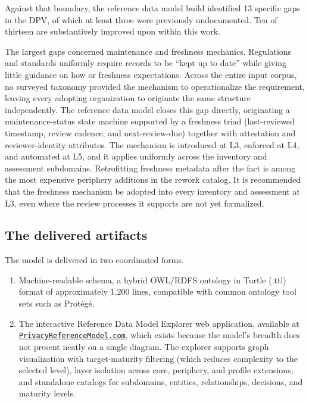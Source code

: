 \documentclass[10pt,letterpaper,twocolumn,twoside]{rho-class/rho}
\begin{document}
Against that boundary, the reference data model build identified 13 specific gaps in the DPV, of which at least three were previously undocumented. Ten of thirteen are substantively improved upon within this work.

The largest gaps concerned maintenance and freshness mechanics. Regulations and standards uniformly require records to be ``kept up to date'' while giving little guidance on how or freshness expectations. Across the entire input corpus, no surveyed taxonomy provided the mechanism to operationalize the requirement, leaving every adopting organization to originate the same structure independently. The reference data model closes this gap directly, originating a maintenance-status state machine supported by a freshness triad (last-reviewed timestamp, review cadence, and next-review-due) together with attestation and reviewer-identity attributes. The mechanism is introduced at L3, enforced at L4, and automated at L5, and it applies uniformly across the inventory and assessment subdomains. Retrofitting freshness metadata after the fact is among the most expensive periphery additions in the rework catalog. It is recommended that the freshness mechanism be adopted into every inventory and assessment at L3, even where the review processes it supports are not yet formalized.

\subsection{The delivered artifacts}\label{sec:artifact}

The model is delivered in two coordinated forms. 

\begin{enumerate}
    \item Machine-readable schema, a hybrid OWL/RDFS ontology in Turtle (.ttl) format of approximately 1,200 lines, compatible with common ontology tool sets such as Prot\'eg\'e.
    \item The interactive Reference Data Model Explorer web application, available at \href{https://privacyreferencemodel.com}{\texttt{PrivacyReferenceModel.com}}, which exists because the model's breadth does not present neatly on a single diagram. The explorer supports graph visualization with target-maturity filtering (which reduces complexity to the selected level), layer isolation across core, periphery, and profile extensions, and standalone catalogs for subdomains, entities, relationships, decisions, and maturity levels. 
\end{enumerate}
\end{document}
